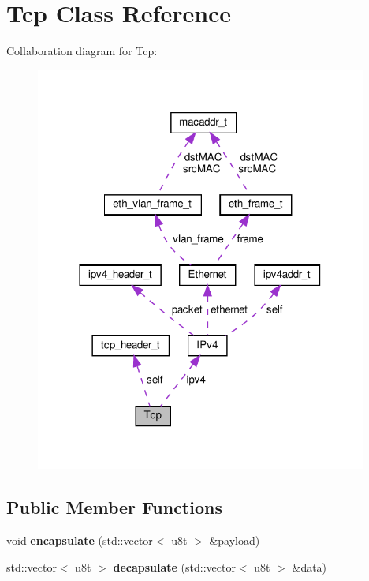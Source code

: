 \hypertarget{classTcp}{}\section{Tcp Class Reference}
\label{classTcp}


Collaboration diagram for Tcp\+:\nopagebreak
\begin{figure}[H]
\begin{center}
\leavevmode
\includegraphics[width=309pt]{classTcp__coll__graph}
\end{center}
\end{figure}
\subsection*{Public Member Functions}
\begin{DoxyCompactItemize}
\item 
\mbox{\label{classTcp_aff0ea81b11c297e17b8791a0c03a8589}} 
void {\bfseries encapsulate} (std\+::vector$<$ u8t $>$ \&payload)
\item 
\mbox{\label{classTcp_ac11613828a7a445052a338e521706ffe}} 
std\+::vector$<$ u8t $>$ {\bfseries decapsulate} (std\+::vector$<$ u8t $>$ \&data)
\end{DoxyCompactItemize}
